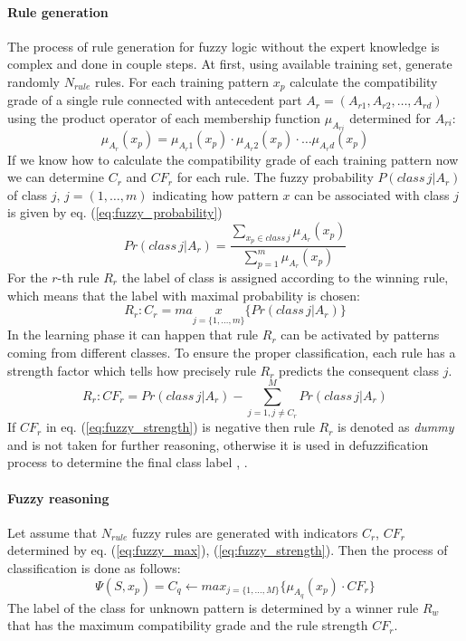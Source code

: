 \paragraph{Rule generation}
\label{cha:Fuzzy_logic_rule_generation}
The process of rule generation for fuzzy logic without the expert knowledge is
complex and done in couple steps. At first, using available
training set, generate randomly $N_{rule}$ rules. For
each training pattern $x_p$ calculate the compatibility grade of a single rule
connected with antecedent part $A_r = (A_{r1}, A_{r2}, \ldots, A_{rd})$ using
the product operator of each membership function $\mu_{A_{ri}}$ determined for
$A_{ri}$:
\begin{equation}
    \mu_{A_r}(x_p)=\mu_{A_r1}(x_p)\cdot\mu_{A_r2}(x_p)\cdot\ldots\mu_{A_rd}(x_p)
    \label{eq:mu_product}
\end{equation}
If we know how to calculate the compatibility grade of each training pattern
now we can determine $C_r$ and $CF_r$ for each rule. The fuzzy probability
$P(class\, j|A_r)$ of class $j$, $j=(1, \ldots, m)$ indicating how pattern $x$ can be associated with class $j$ 
is given by eq. (\ref{eq:fuzzy_probability})
\begin{equation}
    Pr(class \, j|A_r) = \frac{\sum\limits_{x_p \in class\,
    j}\mu_{A_r}(x_p)}{\sum\limits_{p=1}^m\mu_{A_r}(x_p)}
    \label{eq:fuzzy_probability}
\end{equation}
For the $r$-th rule $R_r$ the label of class is assigned according to the
winning rule, which means that the label with maximal probability is chosen:
\begin{equation}
    R_r: C_r = max\limits_{j=\{1, \ldots, m\}}\{Pr(class\,j|A_r)\}
    \label{eq:fuzzy_max}
\end{equation}
In the learning phase it can happen that rule $R_r$ can be activated by
patterns coming from different classes. To ensure the proper classification, each
rule has a strength factor which tells how precisely rule $R_r$ predicts the
consequent class $j$.
\begin{equation}
    R_r: CF_r=Pr(class\, j|A_r) - \sum\limits_{j=1, j\neq C_r}^MPr(class\,j|A_r)
    \label{eq:fuzzy_strength}
\end{equation}
If $CF_r$ in eq. (\ref{eq:fuzzy_strength}) is negative then rule $R_r$ is
denoted as \textit{dummy} and is not taken for further reasoning, otherwise it is used in
defuzzification process to determine the final class label \cite{bib18}, \cite{bib26}.
\paragraph{Fuzzy reasoning}
\label{cha:Fuzzy_reasoning}
Let assume that $N_{rule}$ fuzzy rules are generated with indicators $C_r$,
$CF_r$ determined by eq. (\ref{eq:fuzzy_max}), (\ref{eq:fuzzy_strength}). 
Then the process of classification is done as follows:
\begin{equation}
    \Psi(S, x_p) =  C_q \leftarrow max_{j=\{1,\ldots,
    M\}}\{\mu_{A_{q}}(x_p)\cdot CF_r\}
    \label{eq:fuzzy_classification}
\end{equation}
The label of the class for unknown pattern is determined by a winner rule $R_w$
that has the maximum compatibility grade and the rule strength $CF_r$.

